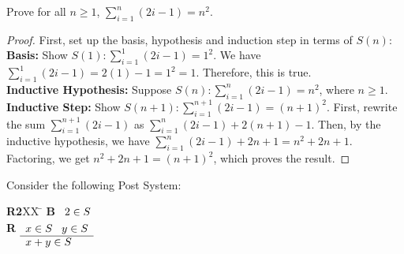 \documentclass[]{exam}
\theoremstyle{definition}
\begin{document}
\begin{questions}

\question Prove for all $n \geq 1$, $\sum_{i=1}^{n} (2i - 1) = n^2$. 
\begin{proof}
First, set up the basis, hypothesis and induction step in terms of $S(n)$:
~\\
\textbf{Basis:} Show $S(1): \sum_{i=1}^1 (2i - 1) = 1^2$. We have $ \sum_{i=1}^1
(2i - 1) = 2(1) - 1 = 1^2 = 1$. Therefore, this is true.
~\\
\textbf{Inductive Hypothesis:} Suppose $S(n): \sum_{i=1}^{n}(2i - 1) = n^2$, 
  where $n \geq 1$.
~\\
\textbf{Inductive Step:} Show $S(n+1): \sum_{i=1}^{n+1} (2i - 1) = (n + 1)^2$. 
First, rewrite the sum $\sum_{i=1}^{n+1} (2i - 1)$ as $\sum_{i=1}^{n}
(2i - 1) + 2(n+1) - 1$. Then, by the inductive hypothesis, we have $\sum_{i=1}^{n}
(2i - 1) + 2n + 1 = n^2 + 2n + 1$. Factoring, we get $n^2 + 2n + 1 = (n + 1)^2$,
which proves the result.

\end{proof}


%
%

\question Consider the following Post System:
\begin{tabbing}
{\bf R2}XX \=  \kill
{\bf B} \>
        \(\begin{array}[t]{l}
        2\in S
        \end{array}\) \\[2ex]
{\bf R} \>
        \(\begin{array}[t]{l}
        x \in S \;\;\;y \in S \\
        \hline
        x + y \in S
        \end{array}\)
\end{tabbing}


\end{questions}
\end{document}
